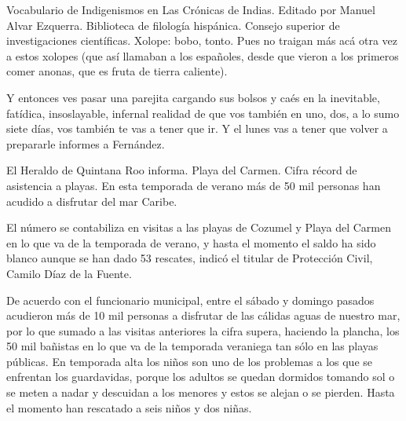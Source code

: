 \documentclass[11pt,twoside,openright,a6paper]{book}
\begin{document}
\vspace{0.5cm}
\hrulefill\hspace{0.2cm} \decofourleft\decofourright \hspace{0.2cm} \hrulefill
\vspace{0.5cm}

Vocabulario de Indigenismos en Las Crónicas de Indias. Editado por  Manuel
Alvar Ezquerra. Biblioteca de filología hispánica. Consejo superior de
investigaciones científicas. Xolope: bobo, tonto. Pues no traigan más
acá otra vez a estos xolopes (que así llamaban a los españoles, desde
que vieron a los primeros comer anonas, que es fruta de tierra caliente).


\vspace{0.5cm}
\hrulefill\hspace{0.2cm} \decofourleft\decofourright \hspace{0.2cm} \hrulefill
\vspace{0.5cm}

Y entonces ves pasar una parejita cargando sus bolsos y caés en la
inevitable, fatídica, insoslayable, infernal realidad de que vos también en
uno, dos, a lo sumo siete días, vos también te vas a tener que ir. Y
el lunes vas a tener que volver a prepararle informes a Fernández.


\vspace{0.5cm}
\hrulefill\hspace{0.2cm} \decofourleft\decofourright \hspace{0.2cm} \hrulefill
\vspace{0.5cm}

El Heraldo de Quintana Roo informa. Playa del Carmen. Cifra récord de
asistencia a playas. En esta temporada de verano más de 50 mil personas
han acudido a disfrutar del mar Caribe.

El número se contabiliza en visitas a las playas de Cozumel y Playa
del Carmen en lo que va de la temporada de verano, y hasta el momento el
saldo ha sido blanco aunque se han dado 53 rescates, indicó el titular de
Protección Civil, Camilo Díaz de la Fuente.

De acuerdo con el funcionario municipal, entre el sábado y domingo pasados
acudieron más de 10 mil personas a disfrutar de las cálidas aguas de
nuestro mar, por lo que sumado a las visitas anteriores la cifra supera,
haciendo la plancha, los 50 mil bañistas en lo que va de la temporada
veraniega tan sólo en las playas públicas.  En temporada alta los niños
son uno de los problemas a los que se enfrentan los guardavidas, porque
los adultos se quedan dormidos tomando sol o se meten a nadar y descuidan a
los menores y estos se alejan o se pierden. Hasta el momento han rescatado
a seis niños y dos niñas.
\end{document}
